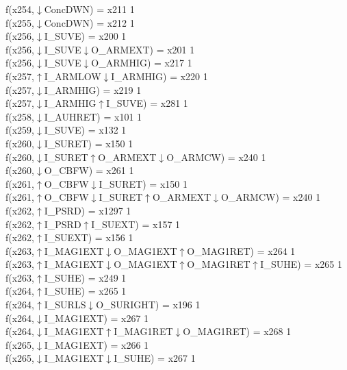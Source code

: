 f(x254,$\downarrow$ConcDWN) = x211 {1} \\
f(x255,$\downarrow$ConcDWN) = x212 {1} \\
f(x256,$\downarrow$I\_SUVE) = x200 {1} \\
f(x256,$\downarrow$I\_SUVE$\downarrow$O\_ARMEXT) = x201 {1} \\
f(x256,$\downarrow$I\_SUVE$\downarrow$O\_ARMHIG) = x217 {1} \\
f(x257,$\uparrow$I\_ARMLOW$\downarrow$I\_ARMHIG) = x220 {1} \\
f(x257,$\downarrow$I\_ARMHIG) = x219 {1} \\
f(x257,$\downarrow$I\_ARMHIG$\uparrow$I\_SUVE) = x281 {1} \\
f(x258,$\downarrow$I\_AUHRET) = x101 {1} \\
f(x259,$\downarrow$I\_SUVE) = x132 {1} \\
f(x260,$\downarrow$I\_SURET) = x150 {1} \\
f(x260,$\downarrow$I\_SURET$\uparrow$O\_ARMEXT$\downarrow$O\_ARMCW) = x240 {1} \\
f(x260,$\downarrow$O\_CBFW) = x261 {1} \\
f(x261,$\uparrow$O\_CBFW$\downarrow$I\_SURET) = x150 {1} \\
f(x261,$\uparrow$O\_CBFW$\downarrow$I\_SURET$\uparrow$O\_ARMEXT$\downarrow$O\_ARMCW) = x240 {1} \\
f(x262,$\uparrow$I\_PSRD) = x1297 {1} \\
f(x262,$\uparrow$I\_PSRD$\uparrow$I\_SUEXT) = x157 {1} \\
f(x262,$\uparrow$I\_SUEXT) = x156 {1} \\
f(x263,$\uparrow$I\_MAG1EXT$\downarrow$O\_MAG1EXT$\uparrow$O\_MAG1RET) = x264 {1} \\
f(x263,$\uparrow$I\_MAG1EXT$\downarrow$O\_MAG1EXT$\uparrow$O\_MAG1RET$\uparrow$I\_SUHE) = x265 {1} \\
f(x263,$\uparrow$I\_SUHE) = x249 {1} \\
f(x264,$\uparrow$I\_SUHE) = x265 {1} \\
f(x264,$\uparrow$I\_SURLS$\downarrow$O\_SURIGHT) = x196 {1} \\
f(x264,$\downarrow$I\_MAG1EXT) = x267 {1} \\
f(x264,$\downarrow$I\_MAG1EXT$\uparrow$I\_MAG1RET$\downarrow$O\_MAG1RET) = x268 {1} \\
f(x265,$\downarrow$I\_MAG1EXT) = x266 {1} \\
f(x265,$\downarrow$I\_MAG1EXT$\downarrow$I\_SUHE) = x267 {1} \\
